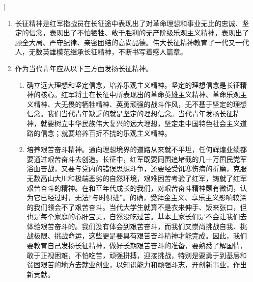 \begin{enumerate}

	\ans[
		\begin{enumerate}
			\item 长征精神是红军指战员在长征途中表现出了对革命理想和事业无比的忠诚、坚定的信念，表现出了不怕牺牲、敢于胜利的无产阶级乐观主义精神，表现出了顾全大局、严守纪律、亲密团结的高尚品德。伟大长征精神教育了一代又一代人，无数英雄模范继承长征精神，不断书写着感人篇章。
			\item {
				作为当代青年应从以下三方面发扬长征精神。
				\begin{enumerate}
					\item {确立远大理想和坚定信念，培养乐观主义精神。坚定的理想信念是长征精神的核心。红军将士在长征中所表现出的革命英雄主义精神、革命乐观主义精神、大无畏的牺牲精神、英勇顽强的战斗作风，无不基于坚定的理想信念。我们当代青年缺乏的就是坚定的理想信念。当代青年发扬长征精神，就要树立中华民族伟大复兴的远大理想，坚定走中国特色社会主义道路的信念；就要培养百折不挠的乐观主义精神。
					}
					\item{培养艰苦奋斗精神。通向理想境界的道路从来就不平坦，任何辉煌业绩都要通过艰苦奋斗去创造。长征中，红军既要同围追堵截的几十万国民党军浴血奋战，又要与党内的错误思想斗争，还要经受饥寒伤病的折磨，克服无数高山大川和极端恶劣的自然环境，艰难困苦考验了红军，铸就了红军艰苦奋斗的精神。在和平年代成长的我们，对艰苦奋斗精神颇有微词，认为它已经过时，无法“与时俱进”。的确，受拜金主义、享乐主义影响较深的我们领会不了艰苦奋斗。当代大学生就算不是衣来伸手、饭来张口，但也是每个家庭的心肝宝贝，自然没吃过苦。基本上家长们是不会让我们去体验艰苦奋斗的。我们没有体会到艰苦奋斗，而我们又崇尚挑战自我、挑战极限、挑战命运，这些更是要具有艰苦奋斗精神才能完成。因此，我们要教育自己发扬长征精神，做好长期艰苦奋斗的准备，要熟悉了解国情，敢于正视困难，不怕吃苦，顽强拼搏，迎接挑战，特别是要勇于到基层和贫困艰苦的地方去就业创业，以知识能力和顽强斗志，开创新事业，作出新贡献。
}
\end{enumerate}}
\end{enumerate}
\end{enumerate}
